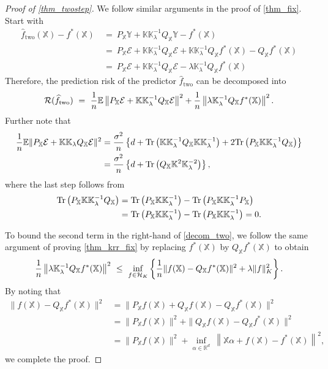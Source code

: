 \documentclass[11pt,twoside]{article}
\def\KK{\mathbb{K}}
\def\YY{\mathbb{Y}}
\def\XX{\mathbb{X}}
\def\RR{\mathbb{R}}
\def\EE{\mathbb{E}}
\def\cH{\mathcal H}
\def\cE{\mathcal E}
\def\cR{\mathcal R}
\def\wh{\widehat}
\def\tr{{\rm Tr}}
\def\two{\text{two}}
\def\l{\left}
\def\r{\right}
\begin{document}
\begin{proof}[Proof of \cref{thm_twostep}]
  We follow similar arguments in the proof of \cref{thm_fix}.   Start with
  \begin{align*}
 \wh f_{\two} (\XX) - f^*  (\XX ) 
&
~ =~ P_ \XX  \YY  +  \KK\KK_{\lambda} ^{-1} Q_{\XX} \YY -  f^*  (\XX) 
\\
&
~ =~ P_ \XX  \cE   +   \KK\KK_{\lambda} ^{-1} Q_{\XX} \cE +  \KK\KK_{\lambda}^{-1}   Q_{\XX}  f^*  (\XX)    - Q_{\XX} f^*  (\XX) \\
&
~ =~ P_ \XX  \cE   +   \KK\KK_{\lambda}^{-1}  Q_{\XX} \cE -  \lambda  \KK_{\lambda}^{-1} Q_{\XX}  f^*  (\XX) 
\end{align*}
Therefore, the prediction risk of the predictor $\wh f_{\two}$  can be decomposed into   
\[
\cR(\wh f_{\two}) ~ =~ 
 {1 \over n} \EE \l\| P_ \XX  \cE   +   \KK\KK_{\lambda} ^{-1}  Q_{\XX} \cE\r\| ^2 +  {1 \over n}\l \|  \lambda \KK_{\lambda}^{-1}  Q_{\XX}  f^*  (\XX)\r\|^2 .
\]
Further note that
\begin{equation}
    \label{decom_two}
    \begin{aligned}
 {1 \over n} \EE \| P_ \XX   \cE   + \KK\KK_{\lambda}  Q_{\XX} \cE\| ^2  
  & =   {\sigma^2  \over n} \left\{ d +    \tr\l(\KK\KK_{\lambda} ^{-1}Q_{\XX}  \KK\KK_{\lambda} ^{-1}\r) +2 \tr\l(P_{\XX}\KK\KK_{\lambda} ^{-1}Q_{\XX}  \r)\right\}
   \\
   & ={\sigma^2  \over n} \left\{ d +     \tr\l( Q_{\XX} \KK^2 \KK_{\lambda}^{-2} \r)  \right\}
   ,
\end{aligned}
\end{equation}
where  the last step follows from 
\begin{align*}
    \tr\l(P_{\XX} \KK \KK_{\lambda} ^{-1}Q_{\XX}  \r)     & =    \tr\l(P_{\XX}\KK\KK_{\lambda} ^{-1} \r)- \tr\l(P_{\XX}\KK\KK_{\lambda} ^{-1}  P_{\XX} \r) \\
    & = \tr\l(P_{\XX}\KK\KK_{\lambda} ^{-1} \r)- \tr\l(P_{\XX}\KK\KK_{\lambda} ^{-1} \r) = 0. 
\end{align*}

To bound the second term in the right-hand of \eqref{decom_two}, we follow the same argument of proving \cref{thm_krr_fix} by replacing $f^*(\XX)$ by $Q_{\XX} f^*(\XX)$ to obtain
\begin{align*}
     {1 \over n}\l \|  \lambda \KK_{\lambda}^{-1}  Q_{\XX}  f^*  (\XX)\r\|^2 ~ \le~   \inf_{f\in \cH_K}\l\{
            {1\over n} \|f(\XX) -Q_{\XX} f^*(\XX)\|^2 + \lambda \|f\|_K^2
        \r\}.
\end{align*}
By noting that
\begin{align*}
   \|f(\XX) -Q_{\XX} f^*(\XX)\|^2   &  
   = \|P_{\XX} f(\XX) +  Q_{\XX} f(\XX) -Q_{\XX} f^*(\XX)\|^2 \\
   & = \|P_{\XX} f(\XX) \|^2+ \|  Q_{\XX} f(\XX) -Q_{\XX} f^*(\XX)\|^2
   \\
   & = \|P_{\XX} f(\XX) \|^2+ \inf_{\alpha\in \RR^d} ~\l \| \XX\alpha+  f(\XX) - f^*(\XX)\r\|^2, 
\end{align*}
we complete the proof. 
\end{proof}
\end{document}
